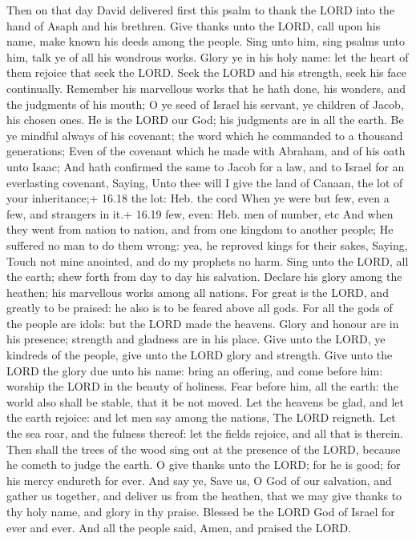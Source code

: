 Then on that day David delivered first this psalm to
thank the LORD into the hand of Asaph and his brethren. 
Give thanks unto the LORD, call upon his name, make known his deeds
among the people.  Sing unto him, sing psalms unto him, talk
ye of all his wondrous works.  Glory ye in his holy name:
let the heart of them rejoice that seek the LORD.  Seek the
LORD and his strength, seek his face continually.  Remember
his marvellous works that he hath done, his wonders, and the judgments
of his mouth;  O ye seed of Israel his servant, ye children
of Jacob, his chosen ones.  He is the LORD our God; his
judgments are in all the earth.  Be ye mindful always of
his covenant; the word which he commanded to a thousand generations;
 Even of the covenant which he made with Abraham, and of
his oath unto Isaac;  And hath confirmed the same to Jacob
for a law, and to Israel for an everlasting covenant, 
Saying, Unto thee will I give the land of Canaan, the lot of your
inheritance;+ 16.18 the lot: Heb. the cord  When ye were
but few, even a few, and strangers in it.+ 16.19 few, even: Heb. men of
number, etc  And when they went from nation to nation, and
from one kingdom to another people;  He suffered no man to
do them wrong: yea, he reproved kings for their sakes, 
Saying, Touch not mine anointed, and do my prophets no harm.
 Sing unto the LORD, all the earth; shew forth from day to
day his salvation.  Declare his glory among the heathen;
his marvellous works among all nations.  For great is the
LORD, and greatly to be praised: he also is to be feared above all gods.
 For all the gods of the people are idols: but the LORD
made the heavens.  Glory and honour are in his presence;
strength and gladness are in his place.  Give unto the
LORD, ye kindreds of the people, give unto the LORD glory and strength.
 Give unto the LORD the glory due unto his name: bring an
offering, and come before him: worship the LORD in the beauty of
holiness.  Fear before him, all the earth: the world also
shall be stable, that it be not moved.  Let the heavens be
glad, and let the earth rejoice: and let men say among the nations, The
LORD reigneth.  Let the sea roar, and the fulness thereof:
let the fields rejoice, and all that is therein.  Then
shall the trees of the wood sing out at the presence of the LORD,
because he cometh to judge the earth.  O give thanks unto
the LORD; for he is good; for his mercy endureth for ever. 
And say ye, Save us, O God of our salvation, and gather us together, and
deliver us from the heathen, that we may give thanks to thy holy name,
and glory in thy praise.  Blessed be the LORD God of Israel
for ever and ever. And all the people said, Amen, and praised the LORD.

